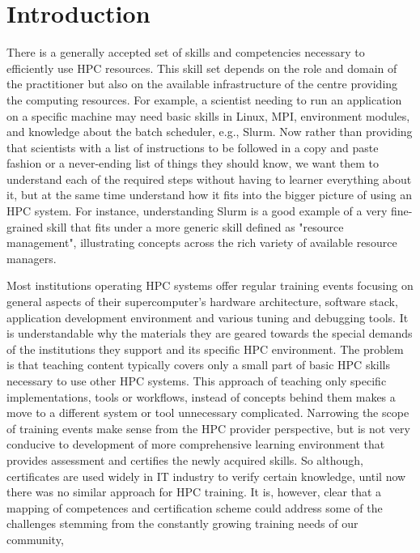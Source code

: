 \documentclass[jocse]{jocseart}
\begin{document}
%
%
\begin{CCSXML}
\end{CCSXML}



\keywords{}

\maketitle

\section{Introduction}

There is a generally accepted set of skills and competencies necessary to efficiently use HPC resources.
This skill set depends on the role and domain of the practitioner but also on the available infrastructure of the centre providing the computing resources.
For example, a scientist needing to run an application on a specific machine may need basic skills in Linux, MPI, environment modules, and knowledge about the batch scheduler, e.g., Slurm.
Now rather than providing that scientists with a list of instructions to be followed in a copy and paste fashion or a never-ending list of things they should know, we want them to understand each of the required steps without having to learner everything about it, but at the same time understand how it fits into the bigger picture of using an HPC system.
For instance, understanding Slurm is a good example of a very fine-grained skill that fits under a more generic skill defined as "resource management", illustrating concepts across the rich variety of available resource managers.

Most institutions operating HPC systems offer regular training events focusing on general aspects of their supercomputer's hardware architecture, software stack, application development environment  and various tuning and debugging tools.
It is understandable why the materials they are geared towards the special demands of the institutions they support and its specific HPC environment.
The problem is that teaching content typically covers only a small part of basic HPC skills necessary to use other HPC systems.
This approach of teaching only specific implementations, tools or workflows, instead of concepts behind them makes a move to a different system or tool unnecessary complicated.
Narrowing the scope of training events make sense from the HPC provider perspective, but is not very conducive to development of more comprehensive learning environment that provides assessment and certifies the newly acquired skills. So although, certificates are used widely in IT industry to verify certain knowledge, until now there was no similar approach for HPC training.
It is, however, clear that a mapping of competences and certification scheme could address some of the challenges stemming from the constantly growing training needs of our community,
\end{document}
